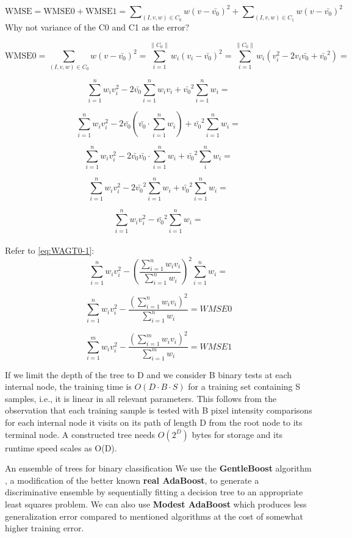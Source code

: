 \begin{compactitem}
\begin{equation}
\label{eq:WMSE}
\text{WMSE}=\text{WMSE0} + \text{WMSE1}=
\sum\nolimits_{(I,v,w) \in C_0} w (v-\bar{v_0})^2 +
\sum\nolimits_{(I,v,w) \in C_1} w (v-\bar{v_0})^2
\end{equation}
Why not variance of the C0 and C1 as the error?

\[\text{WMSE0}=\sum_{(I,v,w) \in C_0} w (v-\bar{v_0})^2=\sum_{i=1}^{\| C_0 \|} w_i (v_i - \bar{v_0})^2=
\sum_{i=1}^{\| C_0 \|} w_i (v_i^2 - 2v_i \bar{v_0} + \bar{v_0}^2)=\]

\[\sum_{i=1}^{n} w_i v_i^2 - 2\bar{v_0}\sum_{i=1}^{n} w_i v_i +
\bar{v_0}^2\sum_{i=1}^{n} w_i=\]

\[\sum_{i=1}^{n} w_i v_i^2 - 2\bar{v_0} (\bar{v_0} \cdot \sum_{i=1}^n w_i) +
\bar{v_0}^2\sum_{i=1}^{n} w_i=\]

\[\sum_{i=1}^{n} w_i v_i^2 - 2\bar{v_0} \bar{v_0} \cdot \sum_{i=1}^n w_i
+ \bar{v_0}^2\sum_i^n w_i=\]

\[\sum_{i=1}^{n} w_i v_i^2 - 2\bar{v_0}^2 \sum_{i=1}^n w_i  +
\bar{v_0}^2 \sum_{i=1}^n w_i=\]

\[\sum_{i=1}^{n} w_i v_i^2 - \bar{v_0}^2 \sum_{i=1}^n w_i = \]
\\
Refer to \eqref{eq:WAGT0-1}:
\[\sum_{i=1}^{n} w_i v_i^2 - (\frac{\sum_{i=1}^{n}  w_i v_i}
{\sum_{i=1}^{n}  w_i})^2 \sum_{i=1}^n w_i = \]

\begin{equation}
\label{eq:WMSE00}
\sum_{i=1}^{n} w_i v_i^2 - \frac{(\sum_{i=1}^{n} w_i v_i)^2}
{\sum_{i=1}^{n}  w_i} = WMSE0
\end{equation}

\begin{equation}
\label{eq:WMSE1}
\sum_{i=1}^{m} w_i v_i^2 - \frac{(\sum_{i=1}^{m} w_i v_i)^2}
{\sum_{i=1}^{m}  w_i} = WMSE1
\end{equation}


If we limit the depth of the tree to D and we consider
B binary tests at each internal node, the training time is
$O(D \cdot B \cdot S)$ for a training set containing S samples, i.e., it
is linear in all relevant parameters. This follows from the
observation that each training sample is tested with B pixel
intensity comparisons for each internal node it visits on its
path of length D from the root node to its terminal node. A
constructed tree needs $O(2^D)$ bytes for storage and its runtime
speed scales as O(D).

\item{An ensemble of trees for binary classification}
We use the \textbf{GentleBoost} algorithm \cite{Friedman98additivelogistic},
a modification of the better known \textbf{real AdaBoost},
to generate a discriminative ensemble by sequentially fitting a
decision tree to an appropriate least squares problem.
We can also use \textbf{Modest AdaBoost} which produces less generalization
error compared to mentioned algorithms at the cost of somewhat higher training error. \cite{GML327}


\end{compactitem}
